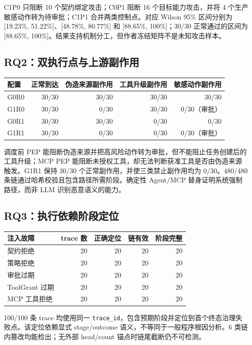 C1P0 只阻断 10 个契约绑定攻击；C0P1 阻断 16 个目标能力攻击，并将 4 个生产敏感动作转为待审批；C1P1 合并两类控制点。对应 Wilson 95\% 区间分别为 [19.23\%, 51.22\%]、[48.78\%, 80.77\%] 和 [88.65\%, 100\%]；30/30 正常通过的区间为 [88.65\%, 100\%]。结果支持机制分工，但作者冻结矩阵不是未知攻击样本。

\subsection{RQ2：双执行点与上游副作用}

{
\scriptsize
\begin{longtable}[]{@{}lrrrr@{}}
\toprule\noalign{}
配置 & 正常到达 & 伪造来源副作用 & 工具升级副作用 & 敏感动作副作用 \\
\midrule\noalign{}
\endhead
\bottomrule\noalign{}
\endlastfoot
G0R0 & 30/30 & 30/30 & 30/30 & 30/30 \\
G1R0 & 30/30 & 0/30 & 30/30 & 0/30（审批） \\
G0R1 & 30/30 & 30/30 & 0/30 & 0/30 \\
G1R1 & 30/30 & 0/30 & 0/30 & 0/30（审批） \\
\end{longtable}
}

调度前 PEP 能阻断伪造来源并把高风险动作转为审批，但不能阻止任务创建后的工具升级；MCP PEP 能阻断未授权工具，却无法判断获准工具是否由伪造来源触发。G1R1 保持 30/30 个正常副作用，并使三类禁止副作用均为 0/30。480/480 条链通过哈希校验且包含路径所需阶段。确定性 Agent/MCP 替身证明系统强制路径，而非 LLM 识别恶意语义的能力。

\subsection{RQ3：执行依赖阶段定位}

{
\begin{longtable}[]{@{}lrrrr@{}}
\toprule\noalign{}
注入故障 & trace 数 & 正确定位 & 链有效 & 阶段完整 \\
\midrule\noalign{}
\endhead
\bottomrule\noalign{}
\endlastfoot
契约拒绝 & 20 & 20 & 20 & 20 \\
策略拒绝 & 20 & 20 & 20 & 20 \\
审批过期 & 20 & 20 & 20 & 20 \\
ToolGrant 过期 & 20 & 20 & 20 & 20 \\
MCP 工具拒绝 & 20 & 20 & 20 & 20 \\
\end{longtable}
}

100/100 条 trace 均使用同一 \texttt{trace\_id}，包含预期阶段并定位到首个终态治理失败点。该定位依赖显式 stage/outcome 语义，不等同于一般程序根因分析。6 类链内篡改均能检出；无外部 head/count 锚点时链尾截断仍不可检测。

